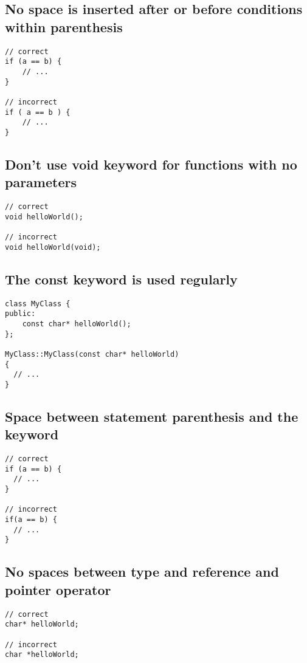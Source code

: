 \documentclass{article}
\begin{document}
\subsection{No space is inserted after or before conditions within parenthesis}

\begin{verbatim}
// correct
if (a == b) {
    // ...
}

// incorrect
if ( a == b ) {
    // ...
}
\end{verbatim}

\subsection{Don't use void keyword for functions with no parameters}

\begin{verbatim}
// correct
void helloWorld();

// incorrect
void helloWorld(void);
\end{verbatim}

\subsection{The const keyword is used regularly}

\begin{verbatim}
class MyClass {
public:
    const char* helloWorld();
};

MyClass::MyClass(const char* helloWorld)
{
  // ...
}
\end{verbatim}

\subsection{Space between statement parenthesis and the keyword}

\begin{verbatim}
// correct
if (a == b) {
  // ...
}

// incorrect
if(a == b) {
  // ...
}
\end{verbatim}

\subsection{No spaces between type and reference and pointer operator}

\begin{verbatim}
// correct
char* helloWorld;

// incorrect
char *helloWorld;
\end{verbatim}
\end{document}
